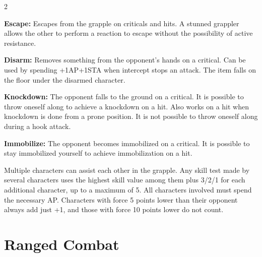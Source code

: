 \begin{multicols}{2}
{\textbf{Escape:} Escapes from the grapple on criticals and hits. A stunned grappler allows the other to perform a reaction to escape without the possibility of active resistance.

\textbf{Disarm:} Removes something from the opponent's hands on a critical. Can be used by spending +1AP+1STA when intercept stops an attack. The item falls on the floor under the disarmed character.

\textbf{Knockdown:} The opponent falls to the ground on a critical. It is possible to throw oneself along to achieve a knockdown on a hit. Also works on a hit when knockdown is done from a prone position. It is not possible to throw oneself along during a hook attack.

\textbf{Immobilize:} The opponent becomes immobilized on a critical. It is possible to stay immobilized yourself to achieve immobilization on a hit.

Multiple characters can assist each other in the grapple. Any skill test made by several characters uses the highest skill value among them plus 3/2/1 for each additional character, up to a maximum of 5. All characters involved must spend the necessary AP. Characters with force 5 points lower than their opponent always add just +1, and those with force 10 points lower do not count.
}


\section{Ranged Combat}

\end{multicols}

